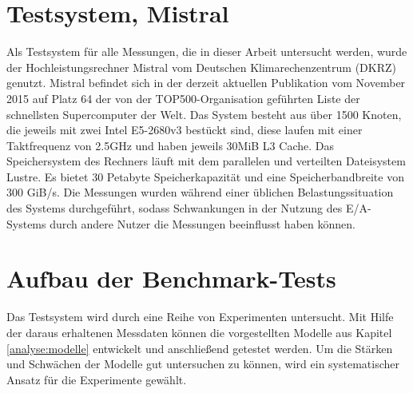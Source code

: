 \documentclass[
	12pt,
	a4paper,
	BCOR10mm,
	DIV14,
	listof=totoc,
	bibliography=totoc,
	headsepline
]{scrreprt}
\begin{document}
\section{Testsystem, Mistral}
\label{eval:testsystem}
Als Testsystem für alle Messungen, die in dieser Arbeit untersucht werden, wurde der Hochleistungsrechner Mistral vom Deutschen Klimarechenzentrum (DKRZ) genutzt.
Mistral befindet sich in der derzeit aktuellen Publikation vom November 2015 auf Platz 64 der von der TOP500-Organisation geführten Liste der schnellsten Supercomputer der Welt.
Das System besteht aus über 1500 Knoten, die jeweils mit zwei Intel E5-2680v3 bestückt sind, diese laufen mit einer Taktfrequenz von 2.5GHz und haben jeweils 30MiB L3 Cache.
Das Speichersystem des Rechners läuft mit dem parallelen und verteilten Dateisystem Lustre.
Es bietet 30 Petabyte Speicherkapazität und eine Speicherbandbreite von 300 GiB/s. Die Messungen wurden während einer üblichen Belastungssituation des Systems durchgeführt, sodass Schwankungen in der Nutzung des E/A-Systems durch andere Nutzer die Messungen beeinflusst haben können.

\section{Aufbau der Benchmark-Tests}
\label{eval:benchmark}
Das Testsystem wird durch eine Reihe von Experimenten untersucht.
Mit Hilfe der daraus erhaltenen Messdaten können die vorgestellten Modelle aus Kapitel \ref{analyse:modelle} entwickelt und anschließend getestet werden.
Um die Stärken und Schwächen der Modelle gut untersuchen zu können, wird ein systematischer Ansatz für die Experimente gewählt.\medskip
\end{document}
